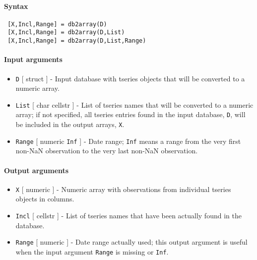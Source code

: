 


	\paragraph{Syntax}
 
 \begin{verbatim}
 [X,Incl,Range] = db2array(D)
 [X,Incl,Range] = db2array(D,List)
 [X,Incl,Range] = db2array(D,List,Range)
 \end{verbatim}
 
 \paragraph{Input arguments}
 
 \begin{itemize}
 \item
   \texttt{D} {[} struct {]} - Input database with tseries objects that
   will be converted to a numeric array.
 \item
   \texttt{List} {[} char \textbar{} cellstr {]} - List of tseries names
   that will be converted to a numeric array; if not specified, all
   tseries entries found in the input database, \texttt{D}, will be
   included in the output arrays, \texttt{X}.
 \item
   \texttt{Range} {[} numeric \textbar{} \texttt{Inf} {]} - Date range;
   \texttt{Inf} means a range from the very first non-NaN observation to
   the very last non-NaN observation.
 \end{itemize}
 
 \paragraph{Output arguments}
 
 \begin{itemize}
 \item
   \texttt{X} {[} numeric {]} - Numeric array with observations from
   individual tseries objects in columns.
 \item
   \texttt{Incl} {[} cellstr {]} - List of tseries names that have been
   actually found in the database.
 \item
   \texttt{Range} {[} numeric {]} - Date range actually used; this output
   argument is useful when the input argument \texttt{Range} is missing
   or \texttt{Inf}.
 \end{itemize}
 
